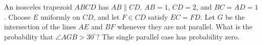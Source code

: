 An isosceles trapezoid $ABCD$ has $AB\parallel CD$, $AB=1$, $CD=2$, and $BC=AD=1$. Choose $E$ uniformly on $CD$, and let $F\in CD$ satisfy $EC=FD$. Let $G$ be the intersection of the lines $AE$ and $BF$ whenever they are not parallel. What is the probability that $\angle AGB>30^\circ$? The single parallel case has probability zero.
